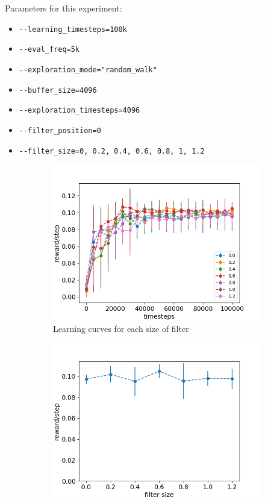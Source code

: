 \documentclass{article}
\begin{document}
Parameters for this experiment:
\begin{itemize}
    \item[] \lstinline|--learning_timesteps=100k|
    \item[] \lstinline|--eval_freq=5k|
    \item[] \lstinline|--exploration_mode="random_walk"|
    \item[] \lstinline|--buffer_size=4096|
    \item[] \lstinline|--exploration_timesteps=4096|
    \item[] \lstinline|--filter_position=0|
    \item[] \lstinline|--filter_size=0, 0.2, 0.4, 0.6, 0.8, 1, 1.2|
\end{itemize}

\begin{figure}[H]
  \centering
   \begin{subfigure}[b]{0.4\linewidth}
    \includegraphics[width=\linewidth]{Study_2/2.2/visualizations/scores_filter_size.png}
      \caption{Learning curves for each size of filter}
  \end{subfigure}
  \begin{subfigure}[b]{0.4\linewidth}
    \includegraphics[width=\linewidth]{Study_2/2.2/visualizations/total_scores.png}

\end{subfigure}
\end{figure}
\end{document}
